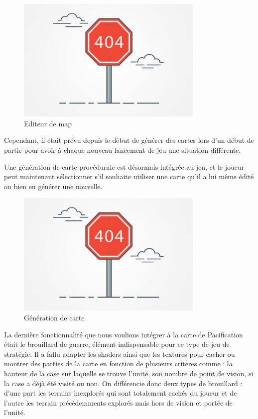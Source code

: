 \documentclass[12pt]{report}
\begin{document}
\begin{figure}[H]
    \centering
    \includegraphics[width=0.8\textwidth]{404}
    \caption{Editeur de map}
\end{figure}

Cependant, il était prévu depuis le début de générer des cartes lors d'un début de partie pour avoir à chaque nouveau lancement de jeu une situation différente.

Une génération de carte procédurale est désormais intégrée au jeu, et le joueur peut maintenant sélectionner s'il souhaite utiliser une carte qu'il a lui même édité ou bien en générer une nouvelle.

\begin{figure}[H]
    \centering
    \includegraphics[width=0.8\textwidth]{404}
    \caption{Génération de carte}
\end{figure}

La dernière fonctionnalité que nous voulions intégrer à la carte de Pacification était le brouillard de guerre, élément indispensable pour ce type de jeu de stratégie. Il a fallu adapter les shaders ainsi que les textures pour cacher ou montrer des parties de la carte en fonction de plusieurs critères comme : la hauteur de la case sur laquelle se trouve l'unité, son nombre de point de vision, si la case a déjà été visité ou non. On différencie donc deux types de brouillard : d'une part les terrains inexplorés qui sont totalement cachés du joueur et de l'autre les terrain précédemments explorés mais hors de vision et portée de l'unité.
\end{document}
